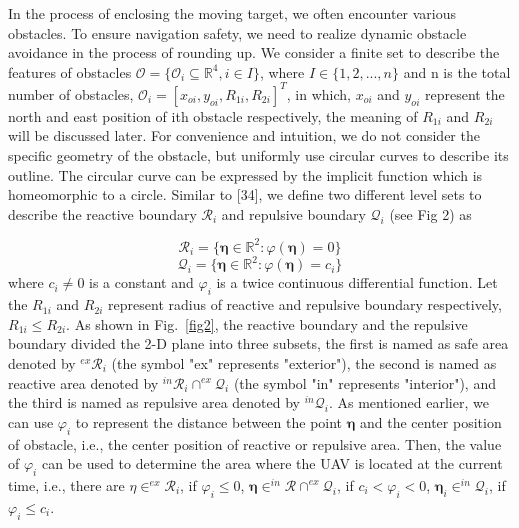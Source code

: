 \documentclass[a4paper, 10pt, conference]{ieeeconf}      %
\begin{document}
In the process of enclosing the moving target, we often encounter various obstacles. To ensure navigation safety, we need to realize dynamic obstacle avoidance in the process of rounding up. We consider a finite set to describe the features of obstacles $\mathcal{O} =\{\mathcal{O} _i\subseteq \mathbb{R}^4,i\in I\}$, where $I\in \{1,2,...,n\}$ and n is the total number of obstacles, $\mathcal{O}_i=[x_{oi},y_{oi},R_{1i},R_{2i} ]^T$, in which, $x_{oi}$ and $y_{oi}$ represent the north and east position of ith obstacle respectively, the meaning of $R_{1i}$ and $R_{2i}$ will be discussed later. For convenience and intuition, we do not consider the specific geometry of the obstacle, but uniformly use circular curves to describe its outline. The circular curve can be expressed by the implicit function which is homeomorphic to a circle. Similar to [34], we define two different level sets to describe the reactive boundary $\mathcal{R}_i$ and repulsive boundary $\mathcal{Q}_i$ (see Fig 2) as 

\begin{equation}\label{eq7}
	\mathcal{R}_i=\{\bm{\eta}\in \mathbb{R}^2:\varphi(\bm{\eta})=0\}
\end{equation}
\begin{equation}\label{eq8}
	\mathcal{Q}_i=\{\bm{\eta}\in \mathbb{R}^2:\varphi(\bm{\eta})=c_i\}
\end{equation}
where $c_i\neq 0$ is a constant and $\varphi_i$ is a twice continuous differential function. Let the $R_{1i}$ and $R_{2i}$ represent radius of reactive and repulsive boundary respectively, $R_{1i}\leq R_{2i}$. As shown in Fig.~\ref{fig2}, the reactive boundary and the repulsive boundary divided the 2-D plane into three subsets, the first is named as safe area denoted by $^{ex}\mathcal{R}_i$ (the symbol "ex" represents "exterior"), the second is named as reactive area denoted by $^{in}\mathcal{R}_i\cap^{ex}\mathcal{Q}_i$ (the symbol "in" represents "interior"), and the third is named as repulsive area denoted by $^{in}\mathcal{Q}_i$. As mentioned earlier, we can use $\varphi_i$ to represent the distance between the point $\bm{\eta}$ and the center position of obstacle, i.e., the center position of reactive or repulsive area. Then, the value of $\varphi_i$ can be used to determine the area where the UAV is located at the current time, i.e., there are $\eta\in^{ex}\mathcal{R}_i$, if $\varphi_i\leq0$, $\bm{\eta}\in^{in}\mathcal{R}\cap^{ex}\mathcal{Q}_i$, if $c_i<\varphi_i<0$, $\bm{\eta}_i\in^{in}\mathcal{Q}_i$, if $\varphi_i\leq c_i$.
\end{document}
